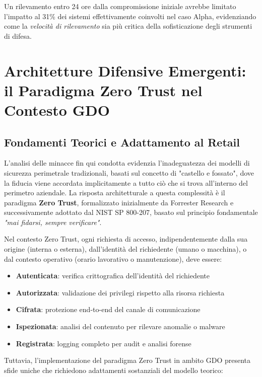 Un rilevamento entro 24 ore dalla compromissione iniziale avrebbe limitato l'impatto al 31\% dei sistemi effettivamente coinvolti nel caso Alpha, evidenziando come la \textit{velocità di rilevamento} sia più critica della sofisticazione degli strumenti di difesa.

\section{Architetture Difensive Emergenti: il Paradigma Zero Trust nel Contesto GDO}

\subsection{Fondamenti Teorici e Adattamento al Retail}

L'analisi delle minacce fin qui condotta evidenzia l'inadeguatezza dei modelli di sicurezza perimetrale tradizionali, basati sul concetto di "castello e fossato", dove la fiducia viene accordata implicitamente a tutto ciò che si trova all'interno del perimetro aziendale. La risposta architetturale a questa complessità è il paradigma \textbf{Zero Trust}, formalizzato inizialmente da Forrester Research e successivamente adottato dal NIST SP 800-207, basato sul principio fondamentale \textit{"mai fidarsi, sempre verificare"}.

Nel contesto Zero Trust, ogni richiesta di accesso, indipendentemente dalla sua origine (interna o esterna), dall'identità del richiedente (umano o macchina), o dal contesto operativo (orario lavorativo o manutenzione), deve essere:
\begin{itemize}
    \item \textbf{Autenticata}: verifica crittografica dell'identità del richiedente
    \item \textbf{Autorizzata}: validazione dei privilegi rispetto alla risorsa richiesta
    \item \textbf{Cifrata}: protezione end-to-end del canale di comunicazione
    \item \textbf{Ispezionata}: analisi del contenuto per rilevare anomalie o malware
    \item \textbf{Registrata}: logging completo per audit e analisi forense
\end{itemize}

Tuttavia, l'implementazione del paradigma Zero Trust in ambito GDO presenta sfide uniche che richiedono adattamenti sostanziali del modello teorico:

